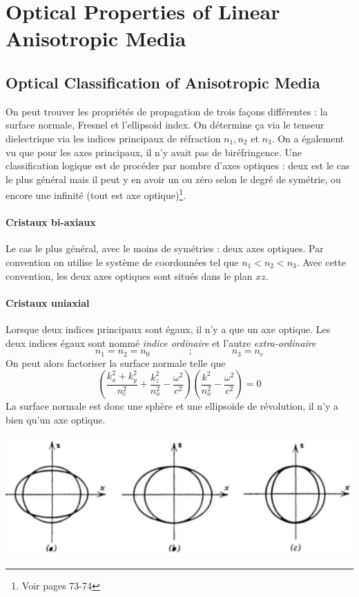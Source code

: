 \chapter{Optical Properties of Linear Anisotropic Media}
\section{Optical Classification of Anisotropic Media}
On peut trouver les propriétés de propagation de trois façons différentes : la surface normale, 
Fresnel et l'ellipsoid index. On détermine ça via le tenseur dielectrique via les indices principaux 
de réfraction $n_1, n_2$ et $n_3$. On a également vu que pour les axes principaux, il n'y avait pas 
de biréfringence. Une classification logique est de procéder par nombre d'axes optiques : deux 
est le cas le plus général mais il peut y en avoir un ou zéro selon le degré de symétrie, ou encore 
une infinité (tout est axe optique)\footnote{Voir pages 73-74}. 

\subsubsection{Cristaux bi-axiaux}
Le cas le plus général, avec le moins de symétries : deux axes optiques. Par convention on utilise le
système de coordonnées tel que $n_1 < n_2 < n_3$. Avec cette convention, les deux axes optiques sont
situés dans le plan $xz$.

\subsubsection{Cristaux uniaxial}
Lorsque deux indices principaux sont égaux, il n'y a que un axe optique. Les deux indices égaux sont
nommé \textit{indice ordinaire} et l'autre \textit{extra-ordinaire}
\begin{equation}
n_1=n_2=n_0\qquad\qquad;\qquad\qquad n_3=n_e
\end{equation}
On peut alors factoriser la surface normale telle que
\begin{equation}
\left(\dfrac{k_x^2+k_y^2}{n_e^2}+\dfrac{k_z^2}{n_o^2}-\dfrac{\omega^2}{c^2}\right)\left(\dfrac{k^2}{n_o^2}
-\dfrac{\omega^2}{c^2}\right)=0
\end{equation}
La surface normale est donc une sphère et une ellipsoïde de révolution, il n'y a bien qu'un axe optique.
\begin{center}
\includegraphics[scale=0.75]{ch5/image1}
\end{center}

